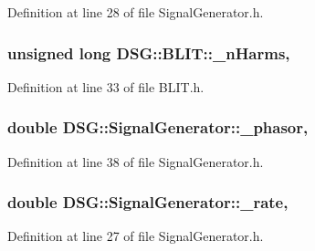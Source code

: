 Definition at line 28 of file Signal\+Generator.\+h.

\hypertarget{classDSG_1_1BLIT_afe749d26f1503740bedd54f5147bc66d}{
\subsubsection[{\+\_\+n\+Harms}]{\setlength{\rightskip}{0pt plus 5cm}unsigned long D\+S\+G\+::\+B\+L\+I\+T\+::\+\_\+n\+Harms\hspace{0.3cm}{\ttfamily [protected]}, {\ttfamily [inherited]}}}\label{classDSG_1_1BLIT_afe749d26f1503740bedd54f5147bc66d}


Definition at line 33 of file B\+L\+I\+T.\+h.

\hypertarget{classDSG_1_1SignalGenerator_ac2271b582bf699275f077ecb642a8cd9}{
\subsubsection[{\+\_\+phasor}]{\setlength{\rightskip}{0pt plus 5cm}double D\+S\+G\+::\+Signal\+Generator\+::\+\_\+phasor\hspace{0.3cm}{\ttfamily [protected]}, {\ttfamily [inherited]}}}\label{classDSG_1_1SignalGenerator_ac2271b582bf699275f077ecb642a8cd9}


Definition at line 38 of file Signal\+Generator.\+h.

\hypertarget{classDSG_1_1SignalGenerator_aa10f6c85d9adee901139ea7fb346f39d}{
\subsubsection[{\+\_\+rate}]{\setlength{\rightskip}{0pt plus 5cm}double D\+S\+G\+::\+Signal\+Generator\+::\+\_\+rate\hspace{0.3cm}{\ttfamily [protected]}, {\ttfamily [inherited]}}}\label{classDSG_1_1SignalGenerator_aa10f6c85d9adee901139ea7fb346f39d}


Definition at line 27 of file Signal\+Generator.\+h.

